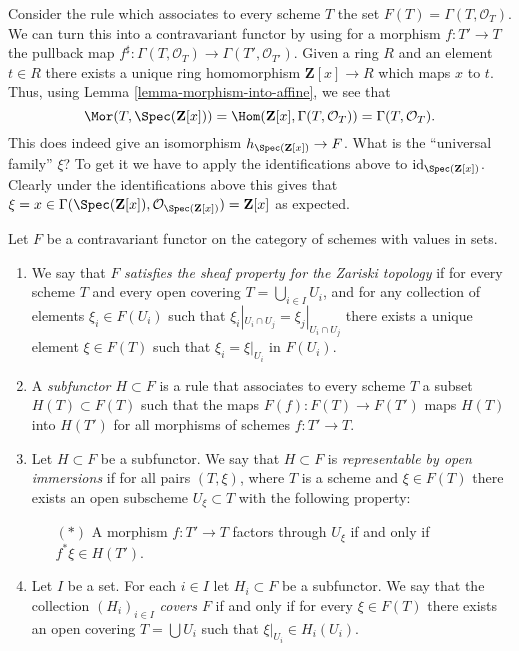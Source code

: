 \begin{example}
\label{example-global-sections}
Consider the rule which associates to every scheme $T$ the set
$F(T) = \Gamma(T, \mathcal{O}_T)$. We can turn this into a contravariant
functor by using for a morphism $f : T' \to T$ the pullback map
$f^\sharp : \Gamma(T, \mathcal{O}_T) \to \Gamma(T', \mathcal{O}_{T'})$.
Given a ring $R$ and an element $t \in R$ there exists a unique
ring homomorphism $\mathbf{Z}[x] \to R$ which maps $x$ to $t$.
Thus, using Lemma \ref{lemma-morphism-into-affine}, we see that
$$
\Mor(T, \Spec(\mathbf{Z}[x])) =
\Hom(\mathbf{Z}[x], \Gamma(T, \mathcal{O}_T)) =
\Gamma(T, \mathcal{O}_T).
$$
This does indeed
give an isomorphism $h_{\Spec(\mathbf{Z}[x])} \to F$.
What is the ``universal family'' $\xi$? To get it we have to
apply the identifications above to $\text{id}_{\Spec(\mathbf{Z}[x])}$.
Clearly under the identifications above this gives
that
$\xi = x \in \Gamma(\Spec(\mathbf{Z}[x]),
\mathcal{O}_{\Spec(\mathbf{Z}[x])}) = \mathbf{Z}[x]$
as expected.
\end{example}

\begin{definition}
\label{definition-representable-by-open-immersions}
Let $F$ be a contravariant functor on the category
of schemes with values in sets.
\begin{enumerate}
\item We say that $F$ {\it satisfies the sheaf property for the
Zariski topology} if for every scheme $T$ and every open covering
$T = \bigcup_{i \in I} U_i$, and for any collection of elements
$\xi_i \in F(U_i)$ such that $\xi_i|_{U_i \cap U_j} =
\xi_j|_{U_i \cap U_j}$ there exists a unique element
$\xi \in F(T)$ such that $\xi_i = \xi|_{U_i}$ in $F(U_i)$.
\item A {\it subfunctor $H \subset F$} is a rule that associates
to every scheme $T$ a subset $H(T) \subset F(T)$ such that
the maps $F(f) : F(T) \to F(T')$ maps $H(T)$ into
$H(T')$ for all morphisms of schemes $f : T' \to T$.
\item Let $H \subset F$ be a subfunctor. We say that
$H \subset F$ is {\it representable by open immersions}
if for all pairs $(T, \xi)$, where $T$ is a scheme and $\xi \in F(T)$
there exists an open subscheme $U_\xi \subset T$ with the following
property:
\begin{itemize}
\item[$(*)$] A morphism $f : T' \to T$ factors through $U_\xi$ if and only
if $f^*\xi \in H(T')$.
\end{itemize}
\item Let $I$ be a set. For each $i \in I$ let $H_i \subset F$
be a subfunctor. We say that the collection $(H_i)_{i \in I}$
{\it covers $F$} if and only if for every $\xi \in F(T)$
there exists an open covering $T = \bigcup U_i$ such that
$\xi|_{U_i} \in H_i(U_i)$.
\end{enumerate}
\end{definition}

